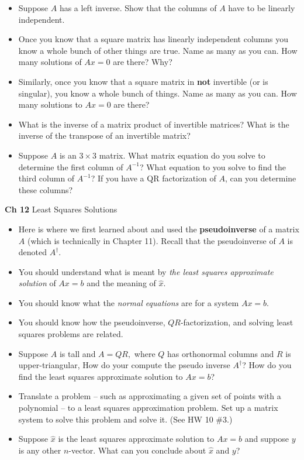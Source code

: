 \documentclass[11pt,fleqn]{article}
\begin{document}
	\begin{itemize}
	\item Suppose $A$ has a left inverse.  Show that the columns of $A$ have to be linearly independent.
	\item Once you know that a square matrix has linearly independent columns you know a whole bunch 
of other things are true.  Name as many as you can.  How many solutions of $Ax=0$ are there?  Why?
	\item Similarly, once you know that a square matrix in \textbf{not} invertible (or is singular), you know a whole bunch of things. Name as many as you can. How many solutions to $Ax=0$ are there?
	\item What is the inverse of a matrix product of invertible matrices? What is the inverse of the transpose of an invertible matrix?	
	\item Suppose $A$ is an $3\times 3$ matrix.  What matrix equation do you solve to determine
the first column of $A^{-1}$? What equation to you solve to find the third column of $A^{-1}$?
If you have a QR factorization of $A$, can you determine these columns?
	\end{itemize}

\noindent\textbf{Ch 12} Least Squares Solutions\\

	\begin{itemize}
	\item Here is where we first learned about and used the \textbf{pseudoinverse} of a matrix $A$ (which is technically in Chapter 11). Recall that the pseudoinverse of $A$ is denoted $A^{\dagger}.$
	\item You should understand what is meant by \emph{the least squares approximate solution} of $Ax=b$ and the meaning of $\hat{x}.$
	\item You should know what the \emph{normal equations} are for a system $Ax=b.$
	\item You should know how the pseudoinverse, $QR$-factorization, and solving least squares problems are related.
	\item Suppose $A$ is tall and $A=QR,$ where $Q$ has orthonormal columns and $R$ is upper-triangular, How do your compute the pseudo inverse $A^\dagger$? How do you find the least squares approximate solution to $Ax=b$?
	\item Translate a problem -- such as approximating a given set of points with a polynomial -- to a least squares approximation problem. Set up a matrix system to solve this problem and solve it. (See HW 10 \#3.)
	\item Suppose $\hat{x}$ is the least squares approximate solution to $Ax=b$ and suppose $y$ is any other $n$-vector. What can you conclude about $\hat{x}$ and $y$?
	\end{itemize}
\end{document}
